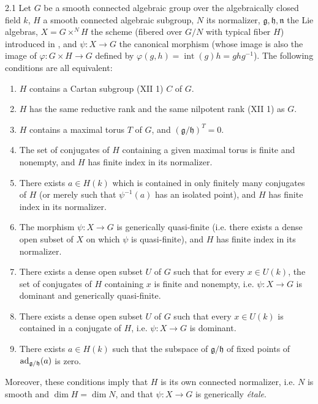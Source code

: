 \begin{theorem}{2.1}\label{XIII.2.1}
Let $G$ be a smooth connected algebraic group over the algebraically closed
field $k$, $H$ a smooth connected algebraic subgroup, $N$ its normalizer,
$\mathfrak g,\mathfrak h,\mathfrak n$ the Lie algebras,
$X=G\times^N H$ the scheme (fibered over $G/N$ with typical fiber $H$)
introduced in , and $\psi:X\to G$ the canonical morphism (whose image
is also the image of $\varphi:G\times H\to G$ defined by
$\varphi(g,h)=\operatorname{int}(g)h=ghg^{-1}$). The following conditions
are all equivalent:
\begin{enumerate}[label=\textup{(\roman*)}]
\item $H$ contains a Cartan subgroup (XII 1) $C$ of $G$.
\item[\textup{(i bis)}] $H$ has the same reductive rank and the same nilpotent
rank (XII 1) as $G$.
\item $H$ contains a maximal torus $T$ of $G$, and
$(\mathfrak g/\mathfrak h)^T=0$.
\item The set of conjugates of $H$ containing a given maximal torus is
finite and nonempty, and $H$ has finite index in its normalizer.
\item There exists $a\in H(k)$ which is contained in only finitely many
conjugates of $H$ (or merely such that $\psi^{-1}(a)$ has an isolated point),
and $H$ has finite index in its normalizer.
\item[\textup{(iv bis)}] The morphism $\psi:X\to G$ is generically
quasi-finite (i.e. there exists a dense open subset of $X$ on which $\psi$
is quasi-finite), and $H$ has finite index in its normalizer.
\item There exists a dense open subset $U$ of $G$ such that for every
$x\in U(k)$, the set of conjugates of $H$ containing $x$ is finite and
nonempty, i.e. $\psi:X\to G$ is dominant and generically quasi-finite.
\item There exists a dense open subset $U$ of $G$ such that every
$x\in U(k)$ is contained in a conjugate of $H$, i.e. $\psi:X\to G$ is dominant.
\item There exists $a\in H(k)$ such that the subspace of $\mathfrak g/\mathfrak h$
of fixed points of $\operatorname{ad}_{\mathfrak g/\mathfrak h}(a)$ is zero.
\end{enumerate}
Moreover, these conditions imply that $H$ is its own connected normalizer,
i.e. $N$ is smooth and $\dim H=\dim N$, and that $\psi:X\to G$ is
generically \emph{\'etale}.
\end{theorem}

